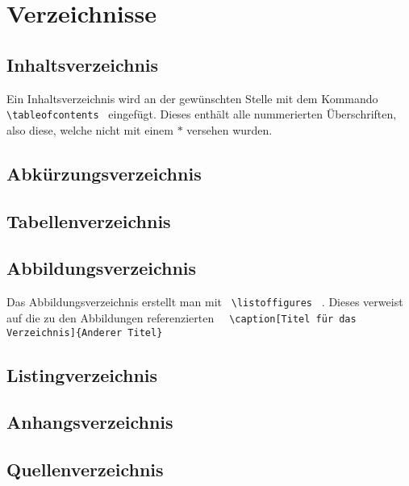 \section{Verzeichnisse}
\subsection{Inhaltsverzeichnis}
Ein Inhaltsverzeichnis wird an der gewünschten Stelle mit dem Kommando 
\lstinline$ \tableofcontents $ eingefügt. Dieses enthält alle nummerierten 
Überschriften, also diese, welche nicht mit einem $*$ versehen wurden.
\subsection{Abkürzungsverzeichnis}

\subsection{Tabellenverzeichnis}
\subsection{Abbildungsverzeichnis}
Das Abbildungsverzeichnis erstellt man mit \lstinline$ \listoffigures $ . 
Dieses verweist auf die zu den Abbildungen referenzierten \lstinline$ 
\caption[Titel für das Verzeichnis]{Anderer Titel} $
\subsection{Listingverzeichnis}
\subsection{Anhangsverzeichnis}
\subsection{Quellenverzeichnis}



\listoftables %
\lstlistoflistings %
